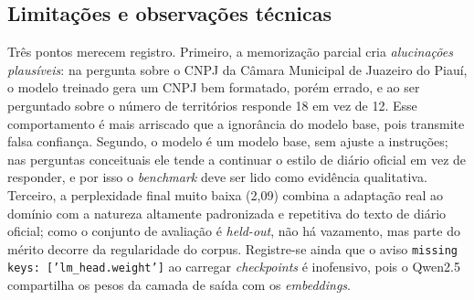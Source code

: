 \subsection{Limitações e observações técnicas}

Três pontos merecem registro. Primeiro, a memorização parcial cria
\emph{alucinações plausíveis}: na pergunta sobre o CNPJ da Câmara Municipal de
Juazeiro do Piauí, o modelo treinado gera um CNPJ bem formatado, porém errado, e ao
ser perguntado sobre o número de territórios responde 18 em vez de 12. Esse
comportamento é mais arriscado que a ignorância do modelo base, pois transmite falsa
confiança. Segundo, o modelo é um modelo base, sem ajuste a instruções; nas
perguntas conceituais ele tende a continuar o estilo de diário oficial em vez de
responder, e por isso o \textit{benchmark} deve ser lido como evidência qualitativa.
Terceiro, a perplexidade final muito baixa (2,09) combina a adaptação real ao
domínio com a natureza altamente padronizada e repetitiva do texto de diário
oficial; como o conjunto de avaliação é \textit{held-out}, não há vazamento, mas
parte do mérito decorre da regularidade do corpus. Registre-se ainda que o aviso
\texttt{missing keys: ['lm\_head.weight']} ao carregar \textit{checkpoints} é
inofensivo, pois o Qwen2.5 compartilha os pesos da camada de saída com os
\textit{embeddings}.
